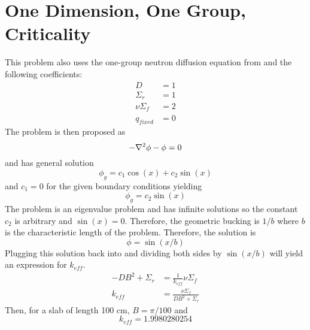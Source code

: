 \section{One Dimension, One Group, Criticality} \label{sc:onegroup1d}
  This problem also uses the one-group neutron diffusion equation from 
   and the following coefficients:
  \begin{align*}
    D &= 1\\
    \Sigma_r &= 1\\
    \nu \Sigma_f &= 2\\
    q_{fixed} &= 0
  \end{align*}
  The problem is then proposed as 
  \begin{equation}
    -\mathbf{\nabla}^2 \phi - \phi = 0 
  \end{equation}
  and has general solution
  \begin{equation}
    \phi_g = c_1 \cos(x) + c_2 \sin(x)
  \end{equation}
  and $c_1 = 0 $ for the given boundary conditions yielding
  \begin{equation} \label{eq:sinshape}
    \phi_g = c_2 \sin(x)
  \end{equation}
  The problem is an eigenvalue problem and has infinite solutions so the 
  constant $c_2$ is arbitrary and $\sin(x)=0$. Therefore, the geometric 
  bucking is $1/b$ where $b$ is the characteristic length of the problem. 
  Therefore, the solution is 
  \begin{equation} \label{eq:onedimensionsol}
    \phi = \sin(x/b)
  \end{equation}
  Plugging this solution back into  and dividing both sides
  by $\sin(x/b)$ will yield an expression for $k_{eff}$.
  \begin{align}
    -D B^2 + \Sigma_r &= \frac{1}{k_{eff}} \nu \Sigma_f \\
    k_{eff} &= \frac{\nu \Sigma_f}{DB^2 + \Sigma_r} \label{eq:keff1d}
  \end{align}
  Then, for a slab of length 100 cm, $B = \pi / 100$ and
  \[ k_{eff} = 1.9980280254 \]
